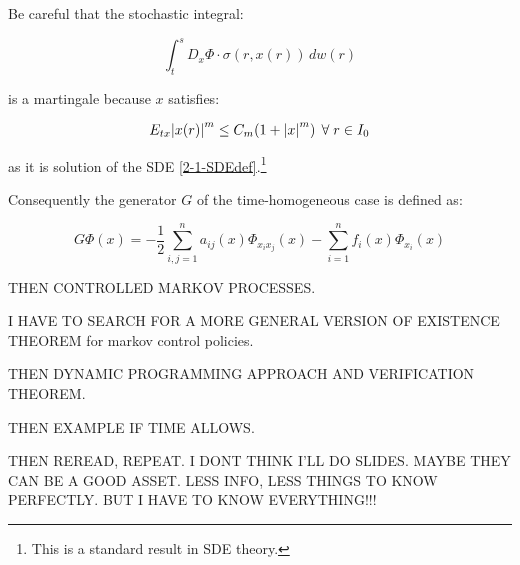 \begin{remark}
    Be careful that the stochastic integral:

    \[\int_t^s D_x\Phi\cdot\sigma(r,x(r))\,dw(r)\]

    is a martingale because $x$ satisfies:

    \[E_{tx}\abs{x(r)}^m\leq C_m(1+\abs{x}^m)\,\forall r\in I_0\]

    as it is solution of the SDE \ref{2-1-SDEdef}.\footnote{This is a standard result in SDE theory.}
\end{remark}

Consequently the generator $G$ of the time-homogeneous case is defined as:

\begin{equation}
    G\Phi(x) = -\frac{1}{2}\sum_{i,j=1}^n a_{ij}(x)\Phi_{x_ix_j}(x) - \sum_{i=1}^n f_i(x)\Phi_{x_i}(x)
\end{equation}


THEN CONTROLLED MARKOV PROCESSES.

I HAVE TO SEARCH FOR A MORE GENERAL VERSION OF EXISTENCE THEOREM for markov control policies.

THEN DYNAMIC PROGRAMMING APPROACH AND VERIFICATION THEOREM.

THEN EXAMPLE IF TIME ALLOWS.

THEN REREAD, REPEAT. I DONT THINK I'LL DO SLIDES. MAYBE THEY CAN BE A GOOD ASSET. LESS INFO, LESS THINGS TO KNOW PERFECTLY. BUT I HAVE TO KNOW EVERYTHING!!!